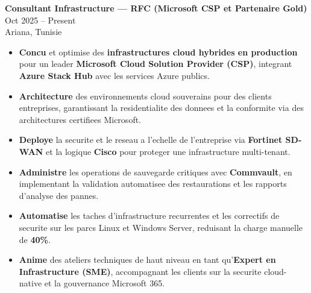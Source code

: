 \documentclass[10pt, letterpaper]{article}
\newenvironment{highlights}{
\begin{itemize}[leftmargin=12pt, itemsep=2pt]
}{
\end{itemize}
}
\begin{document}
\textbf{Consultant Infrastructure --- RFC (Microsoft CSP et Partenaire Gold)} \hfill Oct 2025 -- Present \\
Ariana, Tunisie
\begin{highlights}
\item \textbf{Concu} et optimise des \textbf{infrastructures cloud hybrides en production} pour un leader \textbf{Microsoft Cloud Solution Provider (CSP)}, integrant \textbf{Azure Stack Hub} avec les services Azure publics.
\item \textbf{Architecture} des environnements cloud souverains pour des clients entreprises, garantissant la residentialite des donnees et la conformite via des architectures certifiees Microsoft.
\item \textbf{Deploye} la securite et le reseau a l'echelle de l'entreprise via \textbf{Fortinet SD-WAN} et la logique \textbf{Cisco} pour proteger une infrastructure multi-tenant.
\item \textbf{Administre} les operations de sauvegarde critiques avec \textbf{Commvault}, en implementant la validation automatisee des restaurations et les rapports d'analyse des pannes.
\item \textbf{Automatise} les taches d'infrastructure recurrentes et les correctifs de securite sur les parcs Linux et Windows Server, reduisant la charge manuelle de \textbf{40\%}.
\item \textbf{Anime} des ateliers techniques de haut niveau en tant qu'\textbf{Expert en Infrastructure (SME)}, accompagnant les clients sur la securite cloud-native et la gouvernance Microsoft 365.
\end{highlights}
\end{document}
